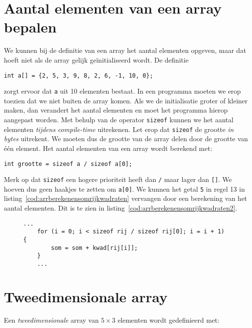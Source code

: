 \section{Aantal elementen van een array bepalen}
We kunnen bij de definitie van een array het aantal elementen opgeven, maar dat hoeft niet als de array gelijk geïnitialiseerd wordt. De definitie

\hspace*{1em}\texttt{int a[] = \{2, 5, 3, 9, 8, 2, 6, -1, 10, 0\};}

zorgt ervoor dat \texttt{a} uit 10 elementen bestaat. In een programma moeten we erop toezien dat we niet buiten de array komen. Als we de initialisatie groter of kleiner maken, dan verandert het aantal elementen en moet het programma hierop aangepast worden. Met behulp van de operator \texttt{sizeof} kunnen we het aantal elementen \textsl{tijdens compile-time} uitrekenen. Let erop dat \texttt{sizeof} de grootte \textsl{in bytes} uitrekent. We moeten dus de grootte van de array delen door de grootte van één element. Het aantal elementen van een array wordt berekend met:

\hspace*{1em}\texttt{int grootte = sizeof a / sizeof a[0];}

Merk op dat \texttt{sizeof} een hogere prioriteit heeft dan \texttt{/} maar lager dan \texttt{[]}. We hoeven dus geen haakjes te zetten om \texttt{a[0]}. We kunnen het getal \texttt{5} in regel 13 in listing~\ref{cod:arrberekenensomrijkwadraten} vervangen door een berekening van het aantal elementen. Dit is te zien in listing~\ref{cod:arrberekenensomrijkwadraten2}.

\begin{figure}[!ht]
\begin{lstlisting}[caption=Bepalen van het aantal elementen in een array.,label=cod:arrberekenensomrijkwadraten2]
    ...
    for (i = 0; i < sizeof rij / sizeof rij[0]; i = i + 1) {
        som = som + kwad[rij[i]];
    }
    ...
\end{lstlisting}
\end{figure}



\section{Tweedimensionale array}
Een \textsl{tweedimensionale} array van $5\times3$ elementen wordt gedefinieerd met:

